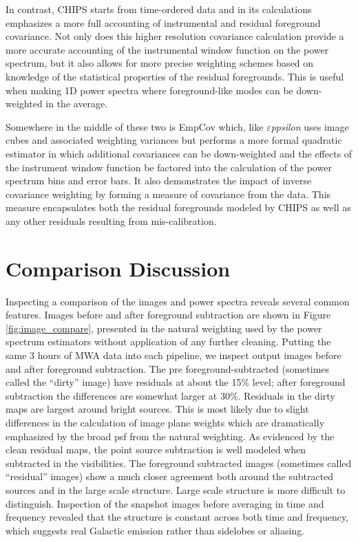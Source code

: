 \documentclass[twolcolumn,iop]{emulateapj}
\def\eppsilon{{\it $\varepsilon$ppsilon}}
\def\empirical{EmpCov}
\begin{document}
In contrast, CHIPS starts from time-ordered data and in its calculations emphasizes a more full accounting of instrumental and residual foreground covariance. Not only does this higher resolution covariance calculation provide a more accurate accounting of the instrumental window function on the power spectrum, but it also allows for more precise weighting schemes based on knowledge of the statistical properties of the residual foregrounds. This is useful when making 1D power spectra where foreground-like modes can be down-weighted in the average. 

Somewhere in the middle of these two is \empirical{} which, like \eppsilon{} uses image cubes and associated weighting variances but performs a more formal quadratic estimator in which additional covariances can be down-weighted and the effects of the instrument window function be factored into the calculation of the power spectrum bins and error bars.  It also demonstrates the impact of inverse covariance weighting by forming a measure of covariance from the data. This measure encapsulates both the residual foregrounds modeled by CHIPS as well as any other residuals resulting from mis-calibration.


\section{Comparison Discussion}
\label{sec:results}

Inspecting a comparison of the images and power spectra reveals several common features. Images before and after foreground subtraction are shown in Figure \ref{fig:image_compare}, presented in the natural weighting used by the power spectrum estimators without application of any further cleaning.  Putting the same 3 hours of MWA data into each pipeline, we inspect output images before and after foreground subtraction. The pre foreground-subtracted (sometimes called the ``dirty'' image) have residuals at about the 15\% level; after foreground subtraction the differences are somewhat larger at 30\%. Residuals in the dirty maps are largest  around bright sources. This is most likely due to slight differences in the calculation of image plane weights which are dramatically emphasized by the broad psf from the natural weighting. As evidenced by the clean residual maps, the point source subtraction is well modeled when subtracted in the visibilities.  The foreground subtracted images (sometimes called ``residual'' images) show a much closer agreement both around the subtracted sources and in the large scale structure. Large scale structure is more difficult to distinguish. Inspection of the snapshot images before averaging in time and frequency revealed that the structure is constant across both time and frequency, which suggests real Galactic emission rather than sidelobes or aliasing.  
\end{document}
